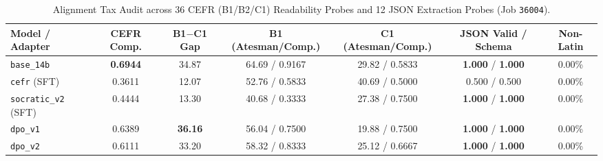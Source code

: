 \documentclass[a4paper,12pt]{report}
\begin{document}
\begin{table}[htbp]
\centering
\small
\caption{Alignment Tax Audit across 36 CEFR (B1/B2/C1) Readability Probes and 12 JSON Extraction Probes (Job \texttt{36004}).}
\label{tab:alignment_tax_cefr}
\scriptsize\setlength{\tabcolsep}{3.0pt}
\begin{tabularx}{\textwidth}{>{\RaggedRight\arraybackslash}Xcccccc}
\toprule
\textbf{Model / Adapter} & \textbf{CEFR Comp.} & \textbf{B1$-$C1 Gap} & \textbf{B1 (Atesman/Comp.)} & \textbf{C1 (Atesman/Comp.)} & \textbf{JSON Valid / Schema} & \textbf{Non-Latin} \\
\midrule
\texttt{base\_14b} & \textbf{0.6944} & 34.87 & 64.69 / 0.9167 & 29.82 / 0.5833 & \textbf{1.000} / \textbf{1.000} & 0.00\% \\
\texttt{cefr} (SFT) & 0.3611 & 12.07 & 52.76 / 0.5833 & 40.69 / 0.5000 & 0.500 / 0.500 & 0.00\% \\
\texttt{socratic\_v2} (SFT) & 0.4444 & 13.30 & 40.68 / 0.3333 & 27.38 / 0.7500 & \textbf{1.000} / \textbf{1.000} & 0.00\% \\
\texttt{dpo\_v1} & 0.6389 & \textbf{36.16} & 56.04 / 0.7500 & 19.88 / 0.7500 & \textbf{1.000} / \textbf{1.000} & 0.00\% \\
\texttt{dpo\_v2} & 0.6111 & 33.20 & 58.32 / 0.8333 & 25.12 / 0.6667 & \textbf{1.000} / \textbf{1.000} & 0.00\% \\
\bottomrule
\end{tabularx}
\end{table}
\end{document}
